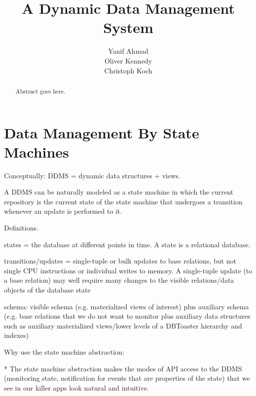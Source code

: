 \documentclass{sig-alternate}
\begin{document}
\title{A Dynamic Data Management System}
\author{
\alignauthor
Yanif Ahmad\\
\alignauthor
Oliver Kennedy\\
\alignauthor
Christoph Koch\\
}
\maketitle

\begin{abstract}
Abstract goes here.
\end{abstract}



\section{Data Management By State Machines}


Conceptually: DDMS = dynamic data structures + views.



A DDMS can be naturally modeled as a state machine in which the current repository is the current state of the state machine that undergoes a transition whenever an update is performed to it.

Definitions.

states = the database at different points in time. A state is a relational database.

transitions/updates = single-tuple or bulk updates to base relations, but not single CPU instructions or individual writes to memory. A single-tuple update (to a base relation) may well require many changes to the visible relations/data objects of the database state

schema: visible schema (e.g. materialized views of interest) plus auxiliary schema (e.g. base relations that we do not want to monitor plus auxiliary data structures such as auxiliary materialized views/lower levels of a DBToaster hierarchy and indexes)




Why use the state machine abstraction:

* The state machine abstraction makes the modes of API access to the DDMS (monitoring state, notification for events that are properties of the state) that we see in our killer apps look natural and intuitive.
\end{document}

